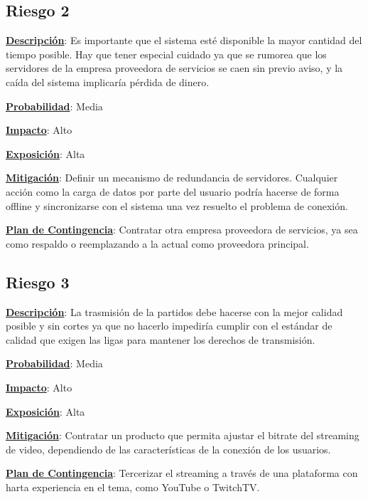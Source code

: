 \subsection*{Riesgo 2}
\textbf{\underline{Descripción}}: Es importante que el sistema esté disponible la mayor cantidad del tiempo posible. Hay que tener especial cuidado ya que se rumorea que los servidores de la empresa proveedora de servicios se caen sin previo aviso, y la caída del sistema implicaría pérdida de dinero.

\textbf{\underline{Probabilidad}}: Media

\textbf{\underline{Impacto}}: Alto

\textbf{\underline{Exposición}}: Alta

\textbf{\underline{Mitigación}}: Definir un mecanismo de redundancia de servidores. Cualquier acción como la carga de datos por parte del usuario podría hacerse de forma offline y sincronizarse con el sistema una vez resuelto el problema de conexión.

\textbf{\underline{Plan de Contingencia}}: Contratar otra empresa proveedora de servicios, ya sea como respaldo o reemplazando a la actual como proveedora principal.


\subsection*{Riesgo 3} 
\textbf{\underline{Descripción}}: La trasmisión de la partidos debe hacerse con la mejor calidad posible y sin cortes ya que no hacerlo impediría cumplir con el estándar de calidad que exigen las ligas para mantener los derechos de transmisión.

\textbf{\underline{Probabilidad}}: Media

\textbf{\underline{Impacto}}: Alto

\textbf{\underline{Exposición}}: Alta

\textbf{\underline{Mitigación}}: Contratar un producto que permita ajustar el bitrate del streaming de video, dependiendo de las características de la conexión de los usuarios.

\textbf{\underline{Plan de Contingencia}}: Tercerizar el streaming a través de una plataforma con harta experiencia en el tema, como YouTube o TwitchTV.



